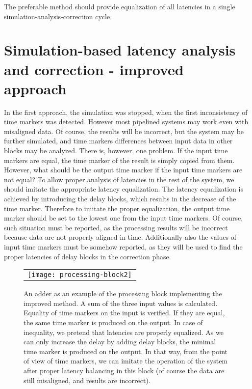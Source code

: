 \documentclass[preprint,11pt]{elsarticle}
\begin{document}
The preferable method should provide equalization of all latencies in a single
simulation-analysis-correction cycle.

\section{Simulation-based latency analysis and correction - improved approach}
In the first approach, the simulation was stopped, when the first inconsistency of time markers was detected.
However most pipelined systems may work even with misaligned data.
Of course, the results will be incorrect, but the system may be further simulated, and time markers differences between input data in other blocks may be analyzed.
There is, however, one problem. If the input time markers are equal, the time marker
of the result is simply copied from them. However, what should be the output time marker if the input time markers are not equal?
To allow proper analysis of latencies in the rest of the system, we should imitate the appropriate latency equalization. The latency equalization is achieved by introducing the delay
blocks, which results in the decrease of the time marker.
Therefore to imitate the proper equalization, the output time marker should be set to the
lowest one from the input time markers.
Of course, such situation must be reported, as the processing results will be incorrect because 
data are not properly aligned in time.
Additionally also the values of input time markers must be somehow reported, as they will be used to find the proper latencies of delay blocks in the correction phase.
	
\begin{figure}[t]
 {   
 \begin{center}
   \begin{tabular}{c}
    \texttt{[image: processing-block2]}
   \end{tabular}
 \end{center}
 \caption
 { \label{fig:adder-block2}
   An adder as an example of the processing block implementing the improved method.
   A sum of the three input values is calculated. Equality of time markers on the input
   is verified. If they are equal, the same time marker is produced on the output.
   In case of inequality, we pretend that latencies are properly equalized. As we can only increase the delay by adding delay blocks, the minimal time marker is produced on the output.
   In that way, from the point of view of time markers, we can imitate the operation of the system after proper latency balancing in this block (of course the data are still misaligned, and results are incorrect).
   }
 }
\end{figure}
	
\end{document}
